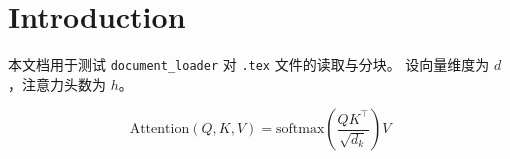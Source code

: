 \documentclass{article}
\begin{document}
\section{Introduction}
本文档用于测试 \texttt{document\_loader} 对 \texttt{.tex} 文件的读取与分块。
设向量维度为 $d$，注意力头数为 $h$。

\begin{equation}
    \mathrm{Attention}(Q,K,V) = \mathrm{softmax}\left(\frac{QK^\top}{\sqrt{d_k}}\right)V\end{equation}
\end{document}
